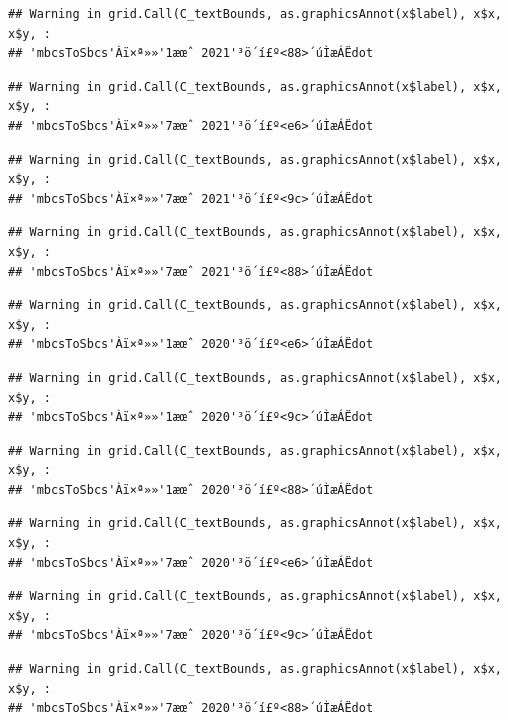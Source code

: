 \documentclass[
]{book}
\begin{document}
\begin{verbatim}
## Warning in grid.Call(C_textBounds, as.graphicsAnnot(x$label), x$x, x$y, :
## 'mbcsToSbcs'Àï×ª»»'1æœˆ 2021'³ö´í£º<88>´úÌæÁËdot
\end{verbatim}

\begin{verbatim}
## Warning in grid.Call(C_textBounds, as.graphicsAnnot(x$label), x$x, x$y, :
## 'mbcsToSbcs'Àï×ª»»'7æœˆ 2021'³ö´í£º<e6>´úÌæÁËdot
\end{verbatim}

\begin{verbatim}
## Warning in grid.Call(C_textBounds, as.graphicsAnnot(x$label), x$x, x$y, :
## 'mbcsToSbcs'Àï×ª»»'7æœˆ 2021'³ö´í£º<9c>´úÌæÁËdot
\end{verbatim}

\begin{verbatim}
## Warning in grid.Call(C_textBounds, as.graphicsAnnot(x$label), x$x, x$y, :
## 'mbcsToSbcs'Àï×ª»»'7æœˆ 2021'³ö´í£º<88>´úÌæÁËdot
\end{verbatim}

\begin{verbatim}
## Warning in grid.Call(C_textBounds, as.graphicsAnnot(x$label), x$x, x$y, :
## 'mbcsToSbcs'Àï×ª»»'1æœˆ 2020'³ö´í£º<e6>´úÌæÁËdot
\end{verbatim}

\begin{verbatim}
## Warning in grid.Call(C_textBounds, as.graphicsAnnot(x$label), x$x, x$y, :
## 'mbcsToSbcs'Àï×ª»»'1æœˆ 2020'³ö´í£º<9c>´úÌæÁËdot
\end{verbatim}

\begin{verbatim}
## Warning in grid.Call(C_textBounds, as.graphicsAnnot(x$label), x$x, x$y, :
## 'mbcsToSbcs'Àï×ª»»'1æœˆ 2020'³ö´í£º<88>´úÌæÁËdot
\end{verbatim}

\begin{verbatim}
## Warning in grid.Call(C_textBounds, as.graphicsAnnot(x$label), x$x, x$y, :
## 'mbcsToSbcs'Àï×ª»»'7æœˆ 2020'³ö´í£º<e6>´úÌæÁËdot
\end{verbatim}

\begin{verbatim}
## Warning in grid.Call(C_textBounds, as.graphicsAnnot(x$label), x$x, x$y, :
## 'mbcsToSbcs'Àï×ª»»'7æœˆ 2020'³ö´í£º<9c>´úÌæÁËdot
\end{verbatim}

\begin{verbatim}
## Warning in grid.Call(C_textBounds, as.graphicsAnnot(x$label), x$x, x$y, :
## 'mbcsToSbcs'Àï×ª»»'7æœˆ 2020'³ö´í£º<88>´úÌæÁËdot
\end{verbatim}
\end{document}
